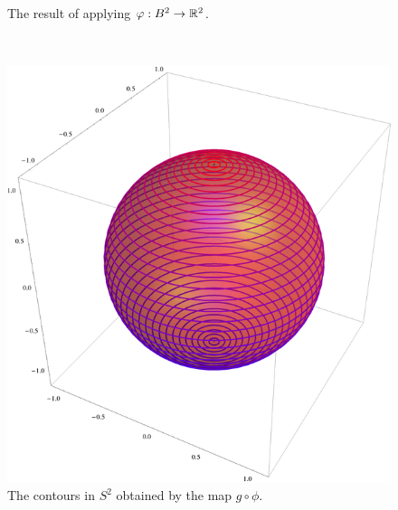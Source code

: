 \begin{figure}
\begin{minipage}{.45\textwidth}
  \caption{The result of applying $\varphi : B^2 \to \mathbb{R}^2$.}
  \label{plane}
\end{minipage}
\\
\begin{minipage}{.5\textwidth}
  \centering
  \includegraphics[width=\linewidth]{images/sphere}
  \caption{The contours in $S^2$ obtained by the map $g \circ \phi$.}
  \label{sphere}
\end{minipage}
\end{figure}

